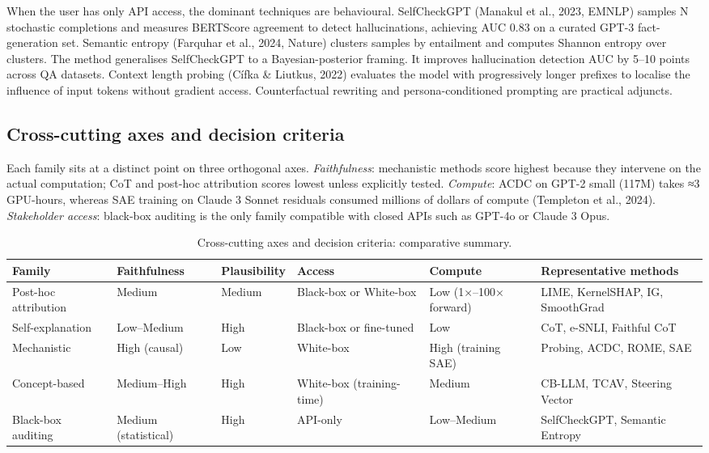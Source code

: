 \documentclass{article}
\begin{document}
When the user has only API access, the dominant techniques are behavioural. SelfCheckGPT (Manakul et al., 2023, EMNLP) samples N stochastic completions and measures BERTScore agreement to detect hallucinations, achieving AUC 0.83 on a curated GPT-3 fact-generation set. Semantic entropy (Farquhar et al., 2024, Nature) clusters samples by entailment and computes Shannon entropy over clusters. The method generalises SelfCheckGPT to a Bayesian-posterior framing. It improves hallucination detection AUC by 5--10 points across QA datasets. Context length probing (Cífka \& Liutkus, 2022) evaluates the model with progressively longer prefixes to localise the influence of input tokens without gradient access. Counterfactual rewriting and persona-conditioned prompting are practical adjuncts.

\subsection{Cross-cutting axes and decision criteria}\label{cross-cutting-axes-and-decision-criteria}

Each family sits at a distinct point on three orthogonal axes. \emph{Faithfulness}: mechanistic methods score highest because they intervene on the actual computation; CoT and post-hoc attribution scores lowest unless explicitly tested. \emph{Compute}: ACDC on GPT-2 small (117M) takes ≈3 GPU-hours, whereas SAE training on Claude 3 Sonnet residuals consumed millions of dollars of compute (Templeton et al., 2024). \emph{Stakeholder access}: black-box auditing is the only family compatible with closed APIs such as GPT-4o or Claude 3 Opus.

\begin{table}[t]
\centering
\caption{Cross-cutting axes and decision criteria: comparative summary.}
\label{tab:cross-cutting-axes-and-decision-criteria}
\begin{tabular}{>{\raggedright\arraybackslash}p{0.1538\linewidth}
  >{\raggedright\arraybackslash}p{0.1538\linewidth}
  >{\raggedright\arraybackslash}p{0.0923\linewidth}
  >{\raggedright\arraybackslash}p{0.1923\linewidth}
  >{\raggedright\arraybackslash}p{0.1615\linewidth}
  >{\raggedright\arraybackslash}p{0.2462\linewidth}}
\toprule
Family & Faithfulness & Plausibility & Access & Compute & Representative methods \\
\midrule
Post-hoc attribution & Medium & Medium & Black-box or White-box & Low (1×--100× forward) & LIME, KernelSHAP, IG, SmoothGrad \\
Self-explanation & Low--Medium & High & Black-box or fine-tuned & Low & CoT, e-SNLI, Faithful CoT \\
Mechanistic & High (causal) & Low & White-box & High (training SAE) & Probing, ACDC, ROME, SAE \\
Concept-based & Medium--High & High & White-box (training-time) & Medium & CB-LLM, TCAV, Steering Vector \\
Black-box auditing & Medium (statistical) & High & API-only & Low--Medium & SelfCheckGPT, Semantic Entropy \\
\end{tabular}
\end{table}
\end{document}

